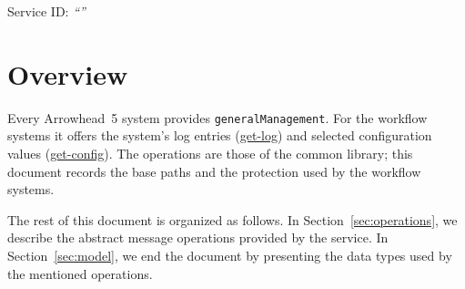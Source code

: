 \documentclass[a4paper]{arrowhead}
\newcommand{\oref}[1]{{\textcolor{ArrowheadBlue}{\hyperref[sec:operations:#1]{#1}}}}
\begin{document}
\ArrowheadSetup

\begin{center}
  \vspace*{1cm}
  \huge{\arrowtitle}

  \vspace*{0.2cm}
  \LARGE{\arrowtype}
  \vspace*{1cm}

  \Large{Service ID: \textit{``\arrowid''}}
  \vspace*{\fill}

  

  \vspace*{1cm}
  \vspace*{\fill}

  \begin{abstract}
    This document describes the \texttt{generalManagement} service of the Eclipse Arrowhead workflow support systems, which gives operators the log and selected configuration of each workflow system. It is provided by each of the three workflow systems, service version 1.0.0, documentation edition 5.4.0.
  \end{abstract}

  \vspace*{1cm}
\end{center}

\newpage

\tableofcontents
\newpage

\section{Overview}
\label{sec:overview}
Every Arrowhead~5 system provides \texttt{generalManagement}. For the workflow systems it offers
the system's log entries (\oref{get-log}) and selected configuration values (\oref{get-config}). The operations are
those of the common library; this document records the base paths and the protection used by the workflow systems.

The rest of this document is organized as follows.
In Section~\ref{sec:operations}, we describe the abstract message operations provided by the service.
In Section~\ref{sec:model}, we end the document by presenting the data types used by the mentioned operations.
\end{document}
